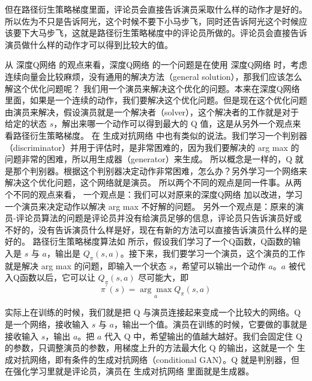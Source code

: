 但在路径衍生策略梯度里面，评论员会直接告诉演员采取什么样的动作才是好的。所以佐为不只是告诉阿光，这个时候不要下小马步飞，同时还告诉阿光这个时候应该要下大马步飞，这就是路径衍生策略梯度中的评论员所做的。评论员会直接告诉演员做什么样的动作才可以得到比较大的值。


从 深度Q网络 的观点来看，深度Q网络 的一个问题是在使用 深度Q网络 时，考虑连续向量会比较麻烦，没有通用的解决方法（general solution），那我们应该怎么解这个优化问题呢？
我们用一个演员来解决这个优化的问题。本来在深度Q网络 里面，如果是一个连续的动作，我们要解决这个优化问题。但是现在这个优化问题由演员来解决，假设演员就是一个解决者（solver），这个解决者的工作就是对于给定的状态 $s$，解出来哪一个动作可以得到最大的 Q 值，这是从另外一个观点来看路径衍生策略梯度。
在 生成对抗网络 中也有类似的说法。我们学习一个判别器（discriminator）并用于评估时，是非常困难的，因为我们要解决的 arg max 的问题非常的困难，所以用生成器（generator）来生成。
所以概念是一样的，Q 就是那个判别器。根据这个判别器决定动作非常困难，怎么办？另外学习一个网络来解决这个优化问题，这个网络就是演员。
所以两个不同的观点是同一件事。从两个不同的观点来看，
一个观点是：我们可以对原来的深度Q网络 加以改进，学习一个演员来决定动作以解决 arg max 不好解的问题。
另外一个观点是：原来的演员-评论员算法的问题是评论员并没有给演员足够的信息，评论员只告诉演员好或不好的，没有告诉演员什么样是好，现在有新的方法可以直接告诉演员什么样的是好的。
路径衍生策略梯度算法如 所示，假设我们学习了一个Q函数，Q函数的输入是 $s$ 与 $a$，输出是 $Q_{\pi}(s,a)$。接下来，我们要学习一个演员，这个演员的工作就是解决 arg max 的问题，即输入一个状态 $s$，希望可以输出一个动作 $a$。$a$ 被代入Q函数以后，它可以让 $Q_{\pi}(s,a)$ 尽可能大，即
\begin{equation}
  \label{eq:}
  \pi^{\prime}(s)=\underset{a}{\arg \max} Q_{\pi}(s, a)
\end{equation}

实际上在训练的时候，我们就是把 Q 与演员连接起来变成一个比较大的网络。Q 是一个网络，接收输入 $s$ 与 $a$，输出一个值。演员在训练的时候，它要做的事就是接收输入 $s$，输出 $a$。把 $a$ 代入 Q 中，希望输出的值越大越好。我们会固定住 Q 的参数，只调整演员的参数，用梯度上升的方法最大化 Q 的输出，这就是一个 生成对抗网络，即有条件的生成对抗网络（conditional GAN）。Q 就是判别器，但在强化学习里就是评论员，演员在 生成对抗网络 里面就是生成器。


